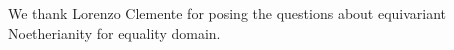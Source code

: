 
\begin{acks}
We thank Lorenzo Clemente for posing the questions about
equivariant Noetherianity for equality domain.
\end{acks}

\newpage








\appendix



